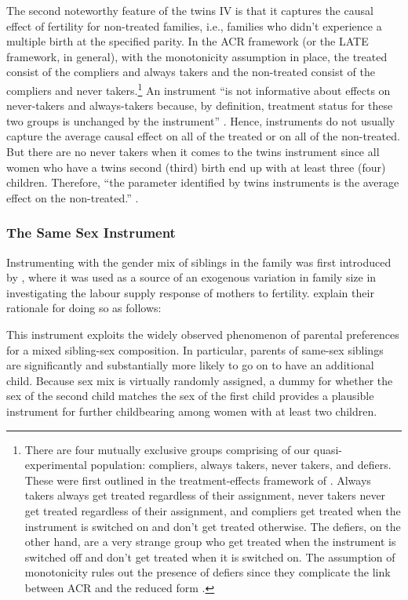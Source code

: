 The second noteworthy feature of the twins IV is that it captures the causal effect of fertility for non-treated families, i.e., families who didn't experience a multiple birth at the specified parity. In the ACR framework (or the LATE framework, in general), with the monotonicity assumption in place, the treated consist of the compliers and always takers and the non-treated consist of the compliers and never takers.\footnote{ There are four mutually exclusive groups comprising of our quasi-experimental population: compliers, always takers, never takers, and defiers. These were first outlined in the treatment-effects framework of \textcite{angrist_identification_1996}. Always takers always get treated regardless of their assignment, never takers never get treated regardless of their assignment, and compliers get treated when the instrument is switched on and don't get treated otherwise. The defiers, on the other hand, are a very strange group who get treated when the instrument is switched off and don't get treated when it is switched on. The assumption of monotonicity rules out the presence of defiers since they complicate the link between ACR and the reduced form \parencite{Angrist2009}. } An instrument \enquote{is not informative about effects on never-takers and always-takers because, by definition, treatment status for these two groups is unchanged by the instrument} \parencite[p.~158]{Angrist2009}. Hence, instruments do not usually capture the average causal effect on all of the treated or on all of the non-treated. But there are no never takers when it comes to the twins instrument since all women who have a twins second (third) birth end up with at least three (four) children. Therefore, \enquote{the parameter identified by twins instruments is the average effect on the non-treated.} \parencite[p.~788]{angrist_multiple_2010}.



\subsubsection{The Same Sex Instrument}
\label{section:samesx}

Instrumenting with the gender mix of siblings in the family was first introduced by \textcite{angrist_children_1998}, where it was used as a source of an exogenous variation in family size in investigating the labour supply response of mothers to fertility. \textcite{angrist_children_1998} explain their rationale for doing so as follows:

\begin{displayquote}[p.~451]
This instrument exploits the widely observed phenomenon of parental preferences for a mixed sibling-sex composition. In particular, parents of same-sex siblings are significantly and substantially more likely to go on to have an additional child. Because sex mix is virtually randomly assigned, a dummy for whether the sex of the second child matches the sex of the first child provides a plausible instrument for further childbearing among women with at least two children. 
\end{displayquote}

